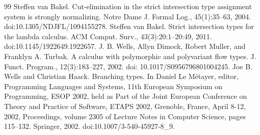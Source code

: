 \documentclass[10pt,a4paper]{article}
\begin{document}
\begin{thebibliography}{99}
 Steffen van Bakel. Cut-elimination in the strict intersection type assignment system is strongly normalizing. Notre Dame J. Formal Log., 45(1):35–63, 2004. doi:10.1305/NDJFL/1094155278.
 Steffen van Bakel. Strict intersection types for the lambda calculus. ACM Comput. Surv., 43(3):20:1–20:49, 2011. doi:10.1145/1922649.1922657.
 J. B. Wells, Allyn Dimock, Robert Muller, and Franklyn A. Turbak. A calculus with polymorphic and polyvariant flow types. J. Funct. Program., 12(3):183–227, 2002. doi: 10.1017/S0956796801004245.
 Joe B. Wells and Christian Haack. Branching types. In Daniel Le Métayer, editor, Programming Languages and Systems, 11th European Symposium on Programming, ESOP 2002, held as Part of the Joint European Conference on Theory and Practice of Software, ETAPS 2002, Grenoble, France, April 8-12, 2002, Proceedings, volume 2305 of Lecture Notes in Computer Science, pages 115–132. Springer, 2002. doi:10.1007/3-540-45927-8\_9.
\end{thebibliography}
\end{document}
